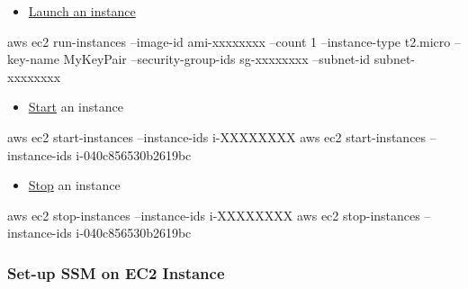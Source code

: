 \documentclass[
]{book}
\newenvironment{Shaded}{\begin{snugshade}}{\end{snugshade}}
\newcommand{\ExtensionTok}[1]{#1}
\newcommand{\NormalTok}[1]{#1}
\providecommand{\tightlist}{%
  \setlength{\itemsep}{0pt}\setlength{\parskip}{0pt}}
\begin{document}
\begin{enumerate}
  \begin{itemize}
  \tightlist
  \item
    \href{https://docs.aws.amazon.com/cli/latest/userguide/cli-ec2-launch.html}{Launch an instance}
  \end{itemize}

\begin{Shaded}
\begin{Highlighting}[]
\ExtensionTok{aws}\NormalTok{ ec2 run-instances --image-id ami-xxxxxxxx --count 1 --instance-type t2.micro --key-name MyKeyPair --security-group-ids sg-xxxxxxxx --subnet-id subnet-xxxxxxxx}
\end{Highlighting}
\end{Shaded}

  \begin{itemize}
  \tightlist
  \item
    \href{https://docs.aws.amazon.com/cli/latest/reference/ec2/start-instances.html}{Start} an instance
  \end{itemize}

\begin{Shaded}
\begin{Highlighting}[]
\ExtensionTok{aws}\NormalTok{ ec2 start-instances --instance-ids i-XXXXXXXX}
\ExtensionTok{aws}\NormalTok{ ec2 start-instances --instance-ids i-040c856530b2619bc}
\end{Highlighting}
\end{Shaded}

  \begin{itemize}
  \tightlist
  \item
    \href{https://docs.aws.amazon.com/cli/latest/reference/ec2/stop-instances.html}{Stop} an instance
  \end{itemize}

\begin{Shaded}
\begin{Highlighting}[]
\ExtensionTok{aws}\NormalTok{ ec2 stop-instances --instance-ids i-XXXXXXXX}
\ExtensionTok{aws}\NormalTok{ ec2 stop-instances --instance-ids i-040c856530b2619bc}
\end{Highlighting}
\end{Shaded}
\end{enumerate}

\hypertarget{set-up-ssm-on-ec2-instance}{%
\subsubsection{Set-up SSM on EC2 Instance}\label{set-up-ssm-on-ec2-instance}}
\end{document}
